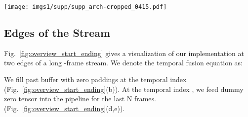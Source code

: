 \documentclass[sigconf]{acmart}
\begin{document}
\begin{table}[h]
\caption{\textbf{Architecture of our U-Net backbone in BSVD-64.}
}
\small
\centering
\renewcommand{\arraystretch}{1.0}
\label{table:U-Net}
\end{table}

\begin{figure*}[ht]
\centering
\texttt{[image: imgs1/supp/supp\_arch-cropped\_0415.pdf]}
\caption{ \textbf{Implementation of start and end in our pipeline}. For a long stream with  frames, we use zero paddings at temporal index  and }
\label{fig:overview_start_ending}
\end{figure*}


\subsection{Edges of the Stream}
Fig.~\ref{fig:overview_start_ending} gives a visualization of our implementation at two edges of a long -frame stream. We denote the temporal fusion equation as:

We fill past buffer  with zero paddings at the temporal index  (Fig.~\ref{fig:overview_start_ending}(b)). At the temporal index , we feed dummy zero tensor  into the pipeline for the last N frames. (Fig.~\ref{fig:overview_start_ending}(d,e)).
\end{document}
